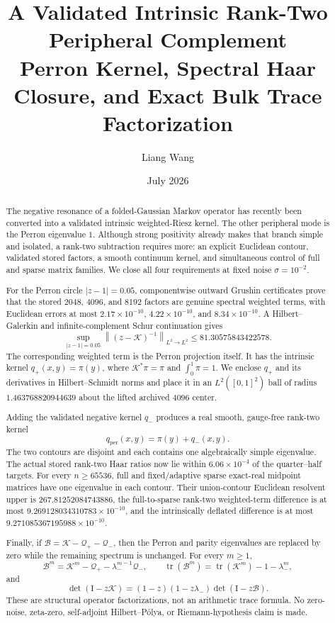 \documentclass[11pt]{article}
\title{A Validated Intrinsic Rank-Two Peripheral Complement\\
\large Perron Kernel, Spectral Haar Closure, and Exact Bulk Trace Factorization}
\author{Liang Wang}
\date{July 2026}
\theoremstyle{definition}
\theoremstyle{remark}
\newcommand{\Id}{\mathrm I}
\newcommand{\cK}{\mathcal K}
\newcommand{\cB}{\mathcal B}
\newcommand{\cQ}{\mathcal Q}
\newcommand{\norm}[1]{\left\lVert #1\right\rVert}
\newcommand{\tr}{\operatorname{tr}}
\newcommand{\detF}{\operatorname{det}}
\begin{document}
\maketitle

\begin{abstract}
The negative resonance of a folded-Gaussian Markov operator has recently
been converted into a validated intrinsic weighted-Riesz kernel.  The other
peripheral mode is the Perron eigenvalue $1$.  Although strong positivity
already makes that branch simple and isolated, a rank-two subtraction
requires more: an explicit Euclidean contour, validated stored factors, a
smooth continuum kernel, and simultaneous control of full and sparse matrix
families.  We close all four requirements at fixed noise
$\sigma=10^{-2}$.

For the Perron circle $|z-1|=0.05$, componentwise outward Grushin
certificates prove that the stored $2048$, $4096$, and $8192$ factors are
genuine spectral weighted terms, with Euclidean errors at most
$2.17\times10^{-10}$, $4.22\times10^{-10}$, and
$8.34\times10^{-10}$.  A Hilbert--Galerkin and infinite-complement Schur
continuation gives
\[
 \sup_{|z-1|=0.05}\norm{(z-\cK)^{-1}}_{L^2\to L^2}
 \le81.30575843422578.
\]
The corresponding weighted term is the Perron projection itself.  It has
the intrinsic kernel $q_+(x,y)=\pi(y)$, where
$\cK^*\pi=\pi$ and $\int_0^1\pi=1$.  We enclose $q_+$ and its derivatives
in Hilbert--Schmidt norms and place it in an $L^2([0,1]^2)$ ball of radius
$1.463768820944639$ about the lifted archived $4096$ center.

Adding the validated negative kernel $q_-$ produces a real smooth,
gauge-free rank-two kernel
\[
 q_{\mathrm{per}}(x,y)=\pi(y)+q_-(x,y).
\]
The two contours are disjoint and each contains one algebraically simple
eigenvalue.  The actual stored rank-two Haar ratios now lie within
$6.06\times10^{-4}$ of the quarter--half targets.  For every
$n\ge65536$, full and fixed/adaptive sparse exact-real midpoint matrices
have one eigenvalue in each contour.  Their union-contour Euclidean
resolvent upper is $267.81252084743886$, the full-to-sparse rank-two
weighted-term difference is at most
$9.269128034310783\times10^{-10}$, and the intrinsically deflated
difference is at most $9.271085367195988\times10^{-10}$.

Finally, if
$\cB=\cK-\cQ_+-\cQ_-$, then the Perron and parity eigenvalues are replaced
by zero while the remaining spectrum is unchanged.  For every $m\ge1$,
\[
 \cB^m=\cK^m-\cQ_+-\lambda_-^{m-1}\cQ_-,
 \qquad
 \tr(\cB^m)=\tr(\cK^m)-1-\lambda_-^m,
\]
and
\[
 \detF(\Id-z\cK)
 =(1-z)(1-z\lambda_-)\detF(\Id-z\cB).
\]
These are structural operator factorizations, not an arithmetic trace
formula.  No zero-noise, zeta-zero, self-adjoint Hilbert--P\'olya, or
Riemann-hypothesis claim is made.
\end{abstract}
\end{document}
